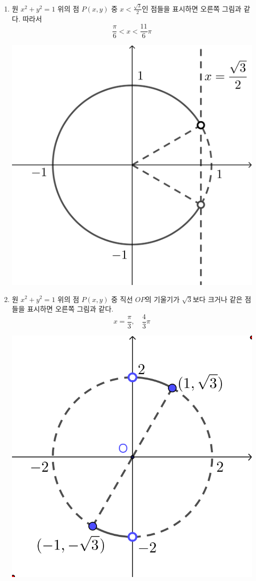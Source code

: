 \documentclass{oblivoir}
\begin{document}
\begin{mdframed}[frametitle=삼각함수의 정의를 사용하는 방법]
\begin{enumerate}
\item
\par\noindent
\begin{minipage}[t]{.5\textwidth}
원 \(x^2+y^2=1\) 위의 점 \(P(x,y)\) 중 \(x<\frac{\sqrt3}2\)인 점들을 표시하면 오른쪽 그림과 같다.
따라서
\[\frac\pi6<x<\frac{11}6\pi\]
\end{minipage}
\begin{minipage}{.4\textwidth}\centering
\includegraphics[width=.6\textwidth]{ineq_1-1}
\end{minipage}
\item
\par\noindent
\begin{minipage}[t]{.5\textwidth}
원 \(x^2+y^2=1\) 위의 점 \(P(x,y)\) 중 직선 \(OP\)의 기울기가 \(\sqrt3\)보다 크거나 같은 점들을 표시하면 오른쪽 그림과 같다.
\[x=\frac\pi3,\quad\frac43\pi\]
\end{minipage}
\begin{minipage}{.4\textwidth}\centering
\includegraphics[width=.6\textwidth]{ineq_1-2}
\end{minipage}
\end{enumerate}
\end{mdframed}
\end{document}
